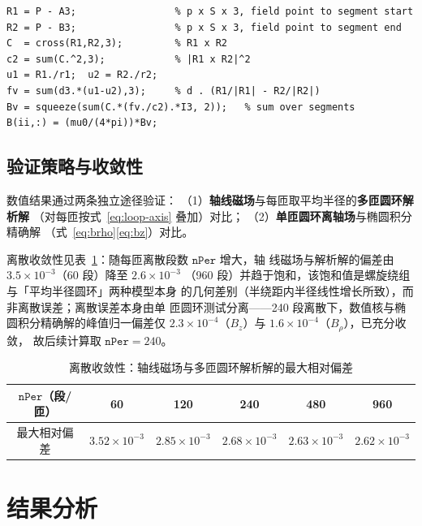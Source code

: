 \documentclass[zihao=-4,a4paper]{ctexart}
\numberwithin{figure}{section}
\numberwithin{table}{section}
\numberwithin{equation}{section}
\begin{document}
\begin{lstlisting}[style=mat, caption={磁场核 \texttt{bs\_field.m} 核心语句（式~\eqref{eq:seg}）}]
R1 = P - A3;                 % p x S x 3, field point to segment start
R2 = P - B3;                 % p x S x 3, field point to segment end
C  = cross(R1,R2,3);         % R1 x R2
c2 = sum(C.^2,3);            % |R1 x R2|^2
u1 = R1./r1;  u2 = R2./r2;
fv = sum(d3.*(u1-u2),3);     % d . (R1/|R1| - R2/|R2|)
Bv = squeeze(sum(C.*(fv./c2).*I3, 2));   % sum over segments
B(ii,:) = (mu0/(4*pi))*Bv;
\end{lstlisting}

\subsection{验证策略与收敛性}

数值结果通过两条独立途径验证：
（1）\textbf{轴线磁场}与每匝取平均半径的\textbf{多匝圆环解析解}
（对每匝按式~\eqref{eq:loop-axis} 叠加）对比；
（2）\textbf{单匝圆环离轴场}与椭圆积分精确解
（式~\eqref{eq:brho}\eqref{eq:bz}）对比。

离散收敛性见表~\ref{tab:conv}：随每匝离散段数 $\mathtt{nPer}$ 增大，轴
线磁场与解析解的偏差由 $3.5\times10^{-3}$（60 段）降至 $2.6\times10^{-3}$
（960 段）并趋于饱和，该饱和值是螺旋绕组与「平均半径圆环」两种模型本身
的几何差别（半绕距内半径线性增长所致），而非离散误差；离散误差本身由单
匝圆环测试分离——240 段离散下，数值核与椭圆积分精确解的峰值归一偏差仅
$2.3\times10^{-4}$（$B_z$）与 $1.6\times10^{-4}$（$B_\rho$），已充分收敛，
故后续计算取 $\mathtt{nPer}=240$。

\begin{table}[htbp]
  \centering
  \caption{离散收敛性：轴线磁场与多匝圆环解析解的最大相对偏差}
  \label{tab:conv}
  \begin{tabular}{cccccc}
    \toprule
    $\mathtt{nPer}$（段/匝） & 60 & 120 & 240 & 480 & 960 \\
    \midrule
    最大相对偏差 & $3.52\times10^{-3}$ & $2.85\times10^{-3}$ &
    $2.68\times10^{-3}$ & $2.63\times10^{-3}$ & $2.62\times10^{-3}$ \\
    \bottomrule
  \end{tabular}
\end{table}

\clearpage
\section{结果分析}\label{sec:results}
\end{document}
